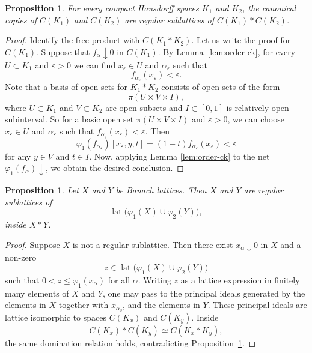 \documentclass[12pt]{amsart}
\DeclareMathOperator{\lat}{lat}
\theoremstyle{plain}
\newtheorem{proposition}[theorem]{Proposition}
\theoremstyle{definition}
\begin{document}
\begin{proposition}\label{prop:regular-ck}
For every compact Hausdorff spaces $K_1$ and $K_2$, the canonical copies of $C(K_1)$ and $C(K_2)$ are regular sublattices of $C(K_1)\ast C(K_2)$.
\end{proposition}

\begin{proof}
Identify the free product with $C(K_1\ast K_2)$. Let us write the proof for $C(K_1)$. Suppose that $f_\alpha\downarrow 0$ in $C(K_1)$. By Lemma~\ref{lem:order-ck}, for every $U\subset K_1$ and $\varepsilon>0$ we can find $x_\varepsilon\in U$ and $\alpha_\varepsilon$ such that \[
f_{\alpha_\varepsilon}(x_\varepsilon)<\varepsilon.
\] 
Note that a basis of open sets for $K_1*K_2$ consists of open sets of the form 
\[
\pi(U\times V\times I),
\]
where $U\subset K_1$ and $V\subset K_2$ are open subsets and $I\subset[0,1]$ is relatively open subinterval. So for a basic open set $\pi(U\times V\times I)$ and $\varepsilon>0$, we can choose $x_\varepsilon\in U$ and $\alpha_\varepsilon$ such that $f_{\alpha_\varepsilon}
(x_\varepsilon)<\varepsilon$. Then
\[
\varphi_1(f_{\alpha_\varepsilon})[x_\varepsilon,y,t]=(1-t)f_{\alpha_\varepsilon}(x_\varepsilon)<\varepsilon
\]
for any $y\in V$ and $t\in I$. Now, applying Lemma \ref{lem:order-ck} to the net $\varphi_1(f_\alpha)\downarrow$, we obtain the desired conclusion.
\end{proof}

\begin{proposition}\label{prop:regular-generated}
Let $X$ and $Y$ be Banach lattices. Then $X$ and $Y$ are regular sublattices of
\[
\lat\bigl(\varphi_1(X)\cup \varphi_2(Y)\bigr),
\]
inside $X\ast Y$.
\end{proposition}

\begin{proof}
Suppose $X$ is not a regular sublattice. Then there exist $x_\alpha\downarrow 0$ in $X$ and a non-zero
\[
z\in \lat\bigl(\varphi_1(X)\cup \varphi_2(Y)\bigr)
\]
such that $0<z\leq \varphi_1(x_\alpha)$ for all $\alpha$. Writing $z$ as a lattice expression in finitely many elements of $X$ and $Y$, one may pass to the principal ideals generated by the elements in $X$ together with $x_{\alpha_0}$, and the elements in $Y$. These principal ideals are lattice isomorphic to spaces $C(K_x)$ and $C(K_y)$. Inside
\[
C(K_x)\ast C(K_y)\simeq C(K_x\ast K_y),
\]
the same domination relation holds, contradicting Proposition~\ref{prop:regular-ck}.
\end{proof}
\end{document}
